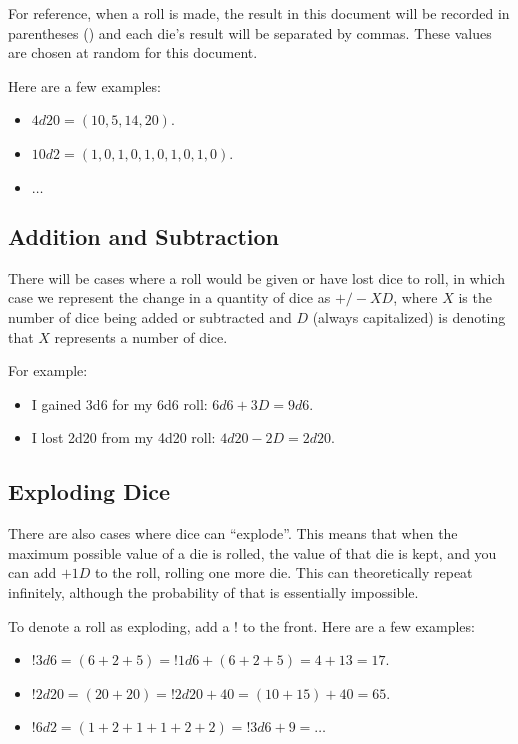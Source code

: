 \documentclass[../main.tex]{subfiles}
\begin{document}
    For reference, when a roll is made, the result in this document will be recorded in parentheses () and each die's result will be separated by commas. These values are chosen at random for this document.

    Here are a few examples:

    \begin{itemize}
        \item $4d20 = (10, 5, 14, 20)$.
        \item $10d2 = (1, 0, 1, 0, 1, 0, 1, 0, 1, 0)$.
        \item $\dots$
    \end{itemize}

    \subsection{Addition and Subtraction}

    There will be cases where a roll would be given or have lost dice to roll, in which case we represent the change in a quantity of dice as $+/-XD$, where $X$ is the number of dice being added or subtracted and $D$ (always capitalized) is denoting that $X$ represents a number of dice.

    For example:
    \begin{itemize}
        \item I gained 3d6 for my 6d6 roll: $6d6 + 3D = 9d6$.
        \item I lost 2d20 from my 4d20 roll: $4d20 - 2D = 2d20$.
    \end{itemize}

    \subsection{Exploding Dice}

    There are also cases where dice can ``explode''. This means that when the maximum possible value of a die is rolled, the value of that die is kept, and you can add $+1D$ to the roll, rolling one more die. This can theoretically repeat infinitely, although the probability of that is essentially impossible.

    To denote a roll as exploding, add a $!$ to the front. Here are a few examples:

    \begin{itemize}
        \item $!3d6 = (6 + 2 + 5) = !1d6 + (6 + 2 + 5) = 4 + 13 = 17$.
        \item $!2d20 = (20 + 20) = !2d20 + 40 = (10 + 15) + 40 = 65$.
        \item $!6d2 = (1 + 2 + 1 + 1 + 2 + 2) = !3d6 + 9 = \dots$
    \end{itemize}
\end{document}
